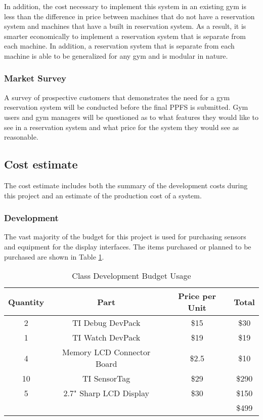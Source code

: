 \documentclass[PPFS.tex]{template/subfiles}
\begin{document}
        In addition, the cost necessary to implement this system in an existing gym is less than the difference in price between machines that do not have a reservation system and machines that have a built in reservation system. As a result, it is smarter economically to implement a reservation system that is separate from each machine. In addition, a reservation system that is separate from each machine is able to be generalized for any gym and is modular in nature.%
        
        \subsubsection{Market Survey}
        
        A survey of prospective customers that demonstrates the need for a gym reservation system will be conducted before the final PPFS is submitted. Gym users and gym managers will be questioned as to what features they would like to see in a reservation system and what price for the system they would see as reasonable.
        
        
    \subsection{Cost estimate}
    The cost estimate includes both the summary of the development costs during this project and an estimate of the production cost of a system.
    
        \subsubsection{Development}
        The vast majority of the budget for this project is used for purchasing sensors and equipment for the display interfaces. The items purchased or planned to be purchased are shown in Table \ref{tab:devPartCost}.
        \begin{table}[H]
        	\begin{center}
        		\caption{Class Development Budget Usage}
        		\label{tab:devPartCost}
        		\begin{tabular}{|c|c|c|c|}
        			\hline
        			Quantity & Part & Price per Unit & Total\\
        			\hline
        			2 & TI Debug DevPack & \$15 & \$30\\
        			\hline
        			1 & TI Watch DevPack & \$19 & \$19\\
        			\hline
        			4 & Memory LCD Connector Board & \$2.5 & \$10\\
        			\hline
        			10 & TI SensorTag & \$29 & \$290\\
        			\hline
        			5 & 2.7" Sharp LCD Display & \$30 & \$150\\
        			\hline
        			&&& \$499\\
        			\hline
        		\end{tabular}
        	\end{center}
        \end{table}
        
\end{document}
